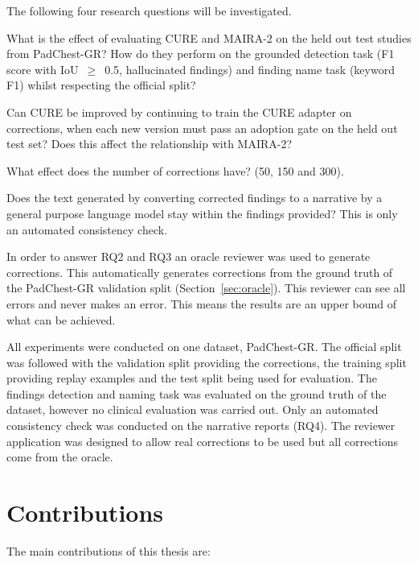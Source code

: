 The following four research questions will be investigated.

\begin{description}[leftmargin=0pt, itemsep=4pt]
  \item[RQ1.] What is the effect of evaluating CURE and MAIRA-2 on the held out test
        studies from PadChest-GR? How do they perform on the grounded detection task
        (F1 score with IoU~$\ge$~0.5, hallucinated findings) and finding name task
        (keyword F1) whilst respecting the official split?
  \item[RQ2.] Can CURE be improved by continuing to train the CURE adapter on
        corrections, when each new version must pass an adoption gate on the held out
        test set? Does this affect the relationship with MAIRA-2?
  \item[RQ3.] What effect does the number of corrections have? (50, 150 and 300).
  \item[RQ4 (Exploratory).] Does the text generated by converting corrected findings to
        a narrative by a general purpose language model stay within the findings
        provided? This is only an automated consistency check.
\end{description}

In order to answer RQ2 and RQ3 an oracle reviewer was used to generate corrections.
This automatically generates corrections from the ground truth of the PadChest-GR
validation split (Section~\ref{sec:oracle}). This reviewer can see all errors and never
makes an error. This means the results are an upper bound of what can be achieved.

All experiments were conducted on one dataset, PadChest-GR. The official split was
followed with the validation split providing the corrections, the training split
providing replay examples and the test split being used for evaluation. The findings
detection and naming task was evaluated on the ground truth of the dataset, however no
clinical evaluation was carried out. Only an automated consistency check was conducted
on the narrative reports (RQ4). The reviewer application was designed to allow real
corrections to be used but all corrections come from the oracle.

\section{Contributions}
\label{sec:contributions}

The main contributions of this thesis are:

